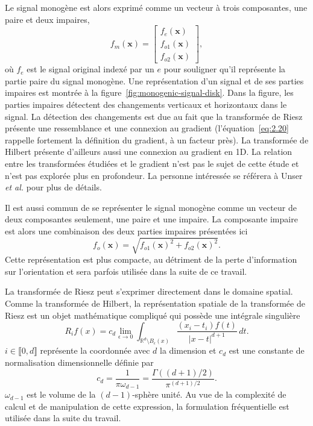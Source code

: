 Le signal monogène est alors exprimé comme un vecteur à trois composantes, une paire et deux impaires,
\begin{equation}
    f_m(\mathbf{x}) =
    \left[
        \begin{array}{c}
        f_e(\mathbf{x}) \\
        f_{o1}(\mathbf{x}) \\
        f_{o2}(\mathbf{x})
        \end{array}
    \right],
\end{equation}
où $f_e$ est le signal original indexé par un $e$ pour souligner qu'il représente la partie paire du signal monogène. Une représentation d'un signal et de ses parties impaires est montrée à la figure~\ref{fig:monogenic-signal-disk}. Dans la figure, les parties impaires détectent des changements verticaux et horizontaux dans le signal. La détection des changements est due au fait que la transformée de Riesz présente une ressemblance et une connexion au gradient (l'équation~\ref{eq:2.20} rappelle fortement la définition du gradient, à un facteur près). La transformée de Hilbert présente d'ailleurs aussi une connexion au gradient en 1D. La relation entre les transformées étudiées et le gradient n'est pas le sujet de cette étude et n'est pas explorée plus en profondeur. La personne intéressée se référera à Unser \textit{et al.}\cite{unser_multiresolution_2009} pour plus de détails.

\bigskip

Il est aussi commun de se représenter le signal monogène comme un vecteur de deux composantes seulement, une paire et une impaire. La composante impaire est alors une combinaison des deux parties impaires présentées ici
\begin{equation}
    f_o(\mathbf{x}) = \sqrt{f_{o1}(\mathbf{x})^2 + f_{o2}(\mathbf{x})^2}.
\end{equation}
Cette représentation est plus compacte, au détriment de la perte d'information sur l'orientation et sera parfois utilisée dans la suite de ce travail.

\bigskip

La transformée de Riesz peut s'exprimer directement dans le domaine spatial. Comme la transformée de Hilbert, la représentation spatiale de la transformée de Riesz est un objet mathématique compliqué qui possède une intégrale singulière
\begin{equation}
    R_if(x) = c_d \lim_{\epsilon \to 0}\int_{\mathbb{R}^d\setminus B_\epsilon(x)}\frac{(x_i-t_i)f(t)}{|x-t|^{d+1}}\,dt.
    \label{eq:riesz-transform-spatial}
\end{equation}
$i\in\llbracket 0, d\rrbracket$ représente la coordonnée avec $d$ la dimension et $c_d$ est une constante de normalisation dimensionnelle définie par
\begin{equation}
    c_d = \frac1{\pi\omega_{d-1}} = \frac{\Gamma((d+1)/2)}{\pi^{(d+1)/2}}.
\end{equation}
$\omega_{d-1}$ est le volume de la $(d-1)$-sphère unité. Au vue de la complexité de calcul et de manipulation de cette expression, la formulation fréquentielle est utilisée dans la suite du travail.

